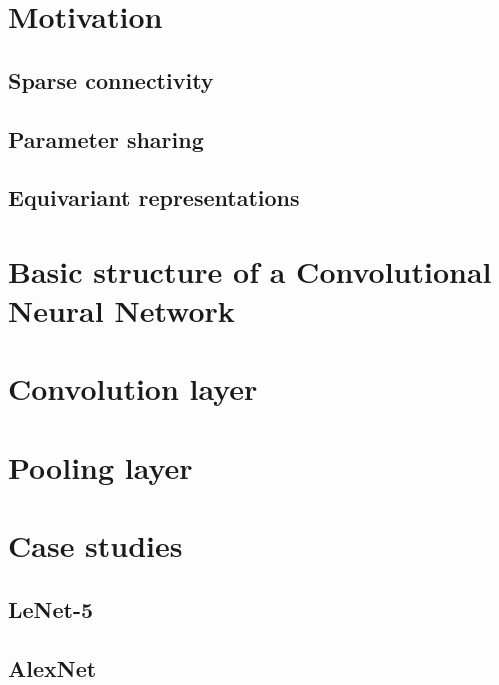 \section{Motivation}

\subsection{Sparse connectivity}

\subsection{Parameter sharing}

\subsection{Equivariant representations}


\section{Basic structure of a Convolutional Neural Network}

\section{Convolution layer}

\section{Pooling layer}




\section{Case studies}
\subsection{LeNet-5}

\subsection{AlexNet}

